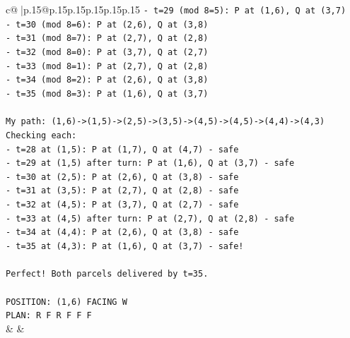 \documentclass{article}
\begin{document}
{\begin{supertabular}{c@{$\;$}|p{.15\linewidth}@{}p{.15\linewidth}p{.15\linewidth}p{.15\linewidth}p{.15\linewidth}p{.15\linewidth}}
{{{\texttt{{-} t=29 (mod 8=5): P at (1,6), Q at (3,7)} \\
\texttt{{-} t=30 (mod 8=6): P at (2,6), Q at (3,8)} \\
\texttt{{-} t=31 (mod 8=7): P at (2,7), Q at (2,8)} \\
\texttt{{-} t=32 (mod 8=0): P at (3,7), Q at (2,7)} \\
\texttt{{-} t=33 (mod 8=1): P at (2,7), Q at (2,8)} \\
\texttt{{-} t=34 (mod 8=2): P at (2,6), Q at (3,8)} \\
\texttt{{-} t=35 (mod 8=3): P at (1,6), Q at (3,7)} \\
\\ 
\texttt{My path: (1,6){-}>(1,5){-}>(2,5){-}>(3,5){-}>(4,5){-}>(4,5){-}>(4,4){-}>(4,3)} \\
\texttt{Checking each:} \\
\texttt{{-} t=28 at (1,5): P at (1,7), Q at (4,7) {-} safe} \\
\texttt{{-} t=29 at (1,5) after turn: P at (1,6), Q at (3,7) {-} safe} \\
\texttt{{-} t=30 at (2,5): P at (2,6), Q at (3,8) {-} safe} \\
\texttt{{-} t=31 at (3,5): P at (2,7), Q at (2,8) {-} safe} \\
\texttt{{-} t=32 at (4,5): P at (3,7), Q at (2,7) {-} safe} \\
\texttt{{-} t=33 at (4,5) after turn: P at (2,7), Q at (2,8) {-} safe} \\
\texttt{{-} t=34 at (4,4): P at (2,6), Q at (3,8) {-} safe} \\
\texttt{{-} t=35 at (4,3): P at (1,6), Q at (3,7) {-} safe!} \\
\\ 
\texttt{Perfect! Both parcels delivered by t=35.} \\
\\ 
\texttt{POSITION: (1,6) FACING W} \\
\texttt{PLAN: R F R F F F} \\
            }
        }
    }
    & & \\ \\


\end{supertabular}}
\end{document}
